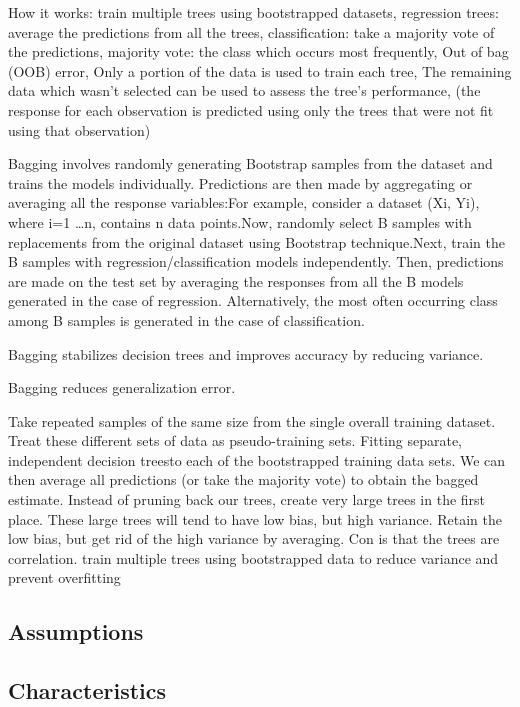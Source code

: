 \documentclass[]{book}
\begin{document}
How it works: train multiple trees using bootstrapped datasets, regression trees: average the predictions from all the trees, classification: take a majority vote of the predictions, majority vote: the class which occurs most frequently, Out of bag (OOB) error, Only a portion of the data is used to train each tree, The remaining data which wasn't selected can be used to assess the tree's performance, (the response for each observation is predicted using
only the trees that were not fit using that observation)

Bagging involves randomly generating Bootstrap samples from the dataset and trains the models individually. Predictions are then made by aggregating or averaging all the response variables:For example, consider a dataset (Xi, Yi), where i=1 \ldots{}n, contains n data points.Now, randomly select B samples with replacements from the original dataset using Bootstrap technique.Next, train the B samples with regression/classification models independently. Then, predictions are made on the test set by averaging the responses from all the B models generated in the case of regression. Alternatively, the most often occurring class among B samples is generated in the case of classification.

Bagging stabilizes decision trees and improves accuracy by reducing variance.

Bagging reduces generalization error.

Take repeated samples of the same size from the single overall training dataset. Treat these different sets of data as pseudo-training sets. Fitting separate, independent decision treesto each of the bootstrapped training data sets. We can then average all predictions (or take the majority vote) to obtain the bagged estimate. Instead of pruning back our trees, create very large trees in the first place. These large trees will tend to have low bias, but high variance. Retain the low bias, but get rid of the high variance by averaging. Con is that the trees are correlation.
train multiple trees using bootstrapped data to reduce variance and prevent overfitting

\hypertarget{assumptions-6}{%
\subsection{Assumptions}\label{assumptions-6}}

\hypertarget{characteristics-5}{%
\subsection{Characteristics}\label{characteristics-5}}
\end{document}
